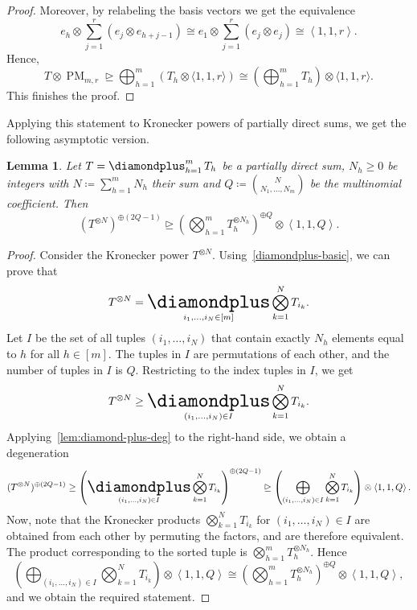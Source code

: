 \documentclass[11pt,letterpaper]{article}
\newtheorem{lemma}[theorem]{Lemma}\AddToHook{env/lemma/begin}{\crefalias{theorem}{lemma}}
\numberwithin{equation}{section}
\DeclareMathOperator*{\bigdiamondplus}{\scalerel*{\diamondplus}{\bigoplus}}
\DeclareMathOperator{\PM}{PM}
\begin{document}
\begin{proof}
  Moreover, by relabeling the basis vectors we get the equivalence
  \[
    e_h \otimes \sum_{j = 1}^{r} (e_j \otimes e_{h+j-1}) \cong e_1 \otimes \sum_{j = 1}^{r} (e_j \otimes e_j) \cong \left<1,1,r\right>.
  \]
  Hence, \[
    T\otimes \PM_{m,r} \trianglerighteq \bigoplus_{h=1}^{m} (T_h \otimes \langle 1,1,r\rangle) \cong \left(\bigoplus_{h = 1}^{m} T_h\right) \otimes \langle 1,1,r \rangle.
  \]
This finishes the proof.
\end{proof}

Applying this statement to Kronecker powers of partially direct sums, we get the following asymptotic version.

\begin{lemma}\label{lem:decoupling-asymptotic}
  Let $T = \bigdiamondplus_{h = 1}^{m} T_h$ be a partially direct sum, $N_h \geq 0$ be integers with $N \coloneqq \sum_{h = 1}^{m} N_h$ their sum and $Q \coloneqq \binom{N}{N_1, \dots, N_{m}}$ be the multinomial coefficient.
  Then \[(T^{\otimes N})^{\oplus (2Q - 1)} \trianglerighteq \left(\bigotimes_{h = 1}^{m} T_h^{\otimes N_h}\right)^{\oplus Q} \otimes \left<1,1,Q\right>.\]
\end{lemma}
\begin{proof}
  Consider the Kronecker power $T^{\otimes N}$.
  Using~\cref{diamondplus-basic}, we can prove that
  \[ T^{\otimes N} = \bigdiamondplus_{i_1, \dots, i_N \in [m]} \bigotimes_{k = 1}^N T_{i_k}. \]
  Let $I$ be the set of all tuples $(i_1, \dots, i_N)$ that contain exactly $N_h$ elements equal to $h$ for all $h \in [m]$.
  The tuples in $I$ are permutations of each other, and the number of tuples in $I$ is $Q$.
  Restricting to the index tuples in $I$, we get
  \[ T^{\otimes N} \geq \bigdiamondplus_{(i_1, \dots, i_N) \in I} \bigotimes_{k = 1}^N T_{i_k}. \]
  Applying~\cref{lem:diamond-plus-deg} to the right-hand side, we obtain a degeneration
  \[
    (T^{\otimes N})^{\oplus (2Q - 1)} \geq \left( \bigdiamondplus_{(i_1, \dots, i_N) \in I} \bigotimes_{k = 1}^N T_{i_k} \right)^{\oplus (2Q - 1)} \trianglerighteq \left( \bigoplus_{(i_1, \dots, i_N) \in I} \bigotimes_{k = 1}^N T_{i_k} \right) \otimes \left<1,1,Q\right>.
  \]
  Now, note that the Kronecker products $\bigotimes_{k = 1}^N T_{i_k}$ for $(i_1, \dots, i_N) \in I$ are obtained from each other by permuting the factors, and are therefore equivalent.
  The product corresponding to the sorted tuple is $\bigotimes_{h = 1}^{m} T_h^{\otimes N_h}$. Hence
  \[
    \left( \bigoplus_{(i_1, \dots, i_N) \in I} \bigotimes_{k = 1}^N T_{i_k} \right) \otimes \left<1,1,Q\right> \cong \left(\bigotimes_{h = 1}^{m} T_h^{\otimes N_h} \right)^{\oplus Q} \otimes \left<1,1,Q\right>,
  \]
  and we obtain the required statement.
\end{proof}
\end{document}
